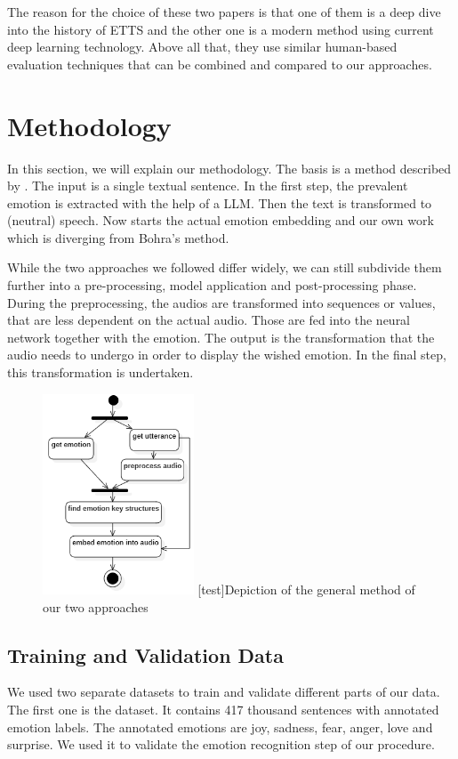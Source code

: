 \documentclass[11pt]{article}
\begin{document}

The reason for the choice of these two papers is that one of them is a deep dive into the history of ETTS and the other one is a modern method using current deep learning technology. Above all that, they use similar human-based evaluation techniques that can be combined and compared to our approaches.

\section{Methodology}
\label{methodology}
In this section, we will explain our methodology. The basis is a method described by \cite{bohra_smart_2022}. The input is a single textual sentence. In the first step, the prevalent emotion is extracted with the help of a LLM. Then the text is transformed to (neutral) speech. Now starts the actual emotion embedding and our own work which is diverging from Bohra's method.

While the two approaches we followed differ widely, we can still subdivide them further into a pre-processing, model application and post-processing phase. During the preprocessing, the audios are transformed into sequences or values, that are less dependent on the actual audio. Those are fed into the neural network together with the emotion. The output is the transformation that the audio needs to undergo in order to display the wished emotion. In the final step, this transformation is undertaken.

\begin{figure}[h]
 \centering
\includegraphics[width=0.4\textwidth]{"Bilder/Prozess.PNG"}
[test]{Depiction of the general method of our two approaches}
\label{Ablauf}
\end{figure}

\subsection{Training and Validation Data}
We used two separate datasets to train and validate different parts of our data.
The first one is the \cite{saravia-etal-2018-carer} dataset. It contains 417 thousand sentences with annotated emotion labels. The annotated emotions are joy, sadness, fear, anger, love and surprise. We used it to validate the emotion recognition step of our procedure.
\end{document}
